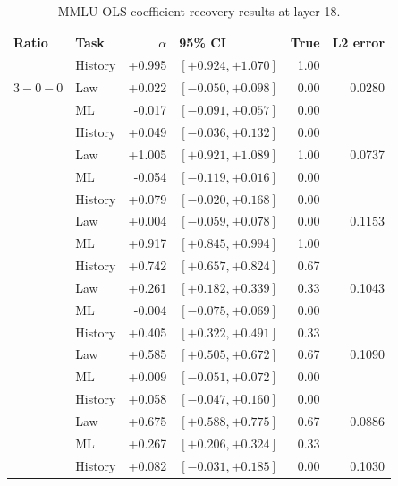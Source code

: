 \documentclass[11pt]{article}
\begin{document}
\begin{table}[H]
\centering
\scriptsize
\renewcommand{\arraystretch}{1.25}
\caption{MMLU OLS coefficient recovery results at layer 18.}
\label{tab:ols_mmlu_results}
\begin{tabular}{llrlrr}
\toprule
\textbf{Ratio} & \textbf{Task} & \textbf{\(\alpha\)} & \textbf{95\% CI} & \textbf{True} & \textbf{L2 error} \\
\midrule
\multirow{3}{*}{\(3-0-0\)} & History & +0.995 & \([+0.924,+1.070]\) & 1.00 & \multirow{3}{*}{0.0280} \\
 & Law & +0.022 & \([-0.050,+0.098]\) & 0.00 & \\
 & ML & -0.017 & \([-0.091,+0.057]\) & 0.00 & \\
\addlinespace
\multirow{3}{*}{\(0-3-0\)} & History & +0.049 & \([-0.036,+0.132]\) & 0.00 & \multirow{3}{*}{0.0737} \\
 & Law & +1.005 & \([+0.921,+1.089]\) & 1.00 & \\
 & ML & -0.054 & \([-0.119,+0.016]\) & 0.00 & \\
\addlinespace
\multirow{3}{*}{\(0-0-3\)} & History & +0.079 & \([-0.020,+0.168]\) & 0.00 & \multirow{3}{*}{0.1153} \\
 & Law & +0.004 & \([-0.059,+0.078]\) & 0.00 & \\
 & ML & +0.917 & \([+0.845,+0.994]\) & 1.00 & \\
\addlinespace
\multirow{3}{*}{\(2-1-0\)} & History & +0.742 & \([+0.657,+0.824]\) & 0.67 & \multirow{3}{*}{0.1043} \\
 & Law & +0.261 & \([+0.182,+0.339]\) & 0.33 & \\
 & ML & -0.004 & \([-0.075,+0.069]\) & 0.00 & \\
\addlinespace
\multirow{3}{*}{\(1-2-0\)} & History & +0.405 & \([+0.322,+0.491]\) & 0.33 & \multirow{3}{*}{0.1090} \\
 & Law & +0.585 & \([+0.505,+0.672]\) & 0.67 & \\
 & ML & +0.009 & \([-0.051,+0.072]\) & 0.00 & \\
\addlinespace
\multirow{3}{*}{\(0-2-1\)} & History & +0.058 & \([-0.047,+0.160]\) & 0.00 & \multirow{3}{*}{0.0886} \\
 & Law & +0.675 & \([+0.588,+0.775]\) & 0.67 & \\
 & ML & +0.267 & \([+0.206,+0.324]\) & 0.33 & \\
\addlinespace
\multirow{3}{*}{\(0-1-2\)} & History & +0.082 & \([-0.031,+0.185]\) & 0.00 & \multirow{3}{*}{0.1030} \\

\end{tabular}
\end{table}
\end{document}
